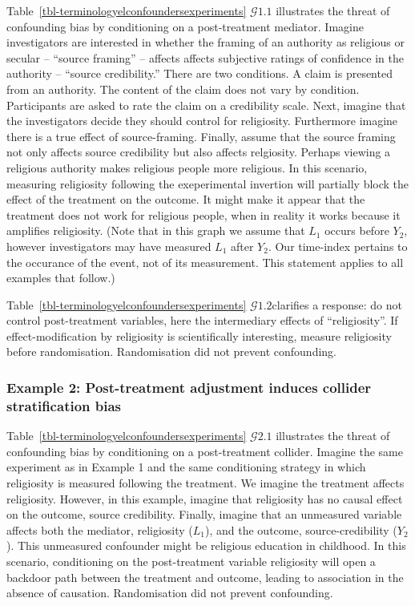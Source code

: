 \documentclass[
  single column]{article}
\begin{document}
Table~\ref{tbl-terminologyelconfoundersexperiments} \(\mathcal{G} 1.1\)
illustrates the threat of confounding bias by conditioning on a
post-treatment mediator. Imagine investigators are interested in whether
the framing of an authority as religious or secular -- ``source
framing'' -- affects affects subjective ratings of confidence in the
authority -- ``source credibility.'' There are two conditions. A claim
is presented from an authority. The content of the claim does not vary
by condition. Participants are asked to rate the claim on a credibility
scale. Next, imagine that the investigators decide they should control
for religiosity. Furthermore imagine there is a true effect of
source-framing. Finally, assume that the source framing not only affects
source credibility but also affects relgiosity. Perhaps viewing a
religious authority makes religious people more religious. In this
scenario, measuring religiosity following the exeperimental invertion
will partially block the effect of the treatment on the outcome. It
might make it appear that the treatment does not work for religious
people, when in reality it works because it amplifies religiosity. (Note
that in this graph we assume that \(L_1\) occurs before \(Y_2\), however
investigators may have measured \(L_1\) after \(Y_2\). Our time-index
pertains to the occurance of the event, not of its measurement. This
statement applies to all examples that follow.)

Table~\ref{tbl-terminologyelconfoundersexperiments}
\(\mathcal{G} 1.2\)clarifies a response: do not control post-treatment
variables, here the intermediary effects of ``religiosity''. If
effect-modification by religiosity is scientifically interesting,
measure religiosity before randomisation. Randomisation did not prevent
confounding.

\subsubsection{Example 2: Post-treatment adjustment induces collider
stratification
bias}\label{example-2-post-treatment-adjustment-induces-collider-stratification-bias}

Table~\ref{tbl-terminologyelconfoundersexperiments} \(\mathcal{G} 2.1\)
illustrates the threat of confounding bias by conditioning on a
post-treatment collider. Imagine the same experiment as in Example 1 and
the same conditioning strategy in which religiosity is measured
following the treatment. We imagine the treatment affects religiosity.
However, in this example, imagine that religiosity has no causal effect
on the outcome, source credibility. Finally, imagine that an unmeasured
variable affects both the mediator, religiosity (\(L_1\)), and the
outcome, source-credibility (\(Y_2\)). This unmeasured confounder might
be religious education in childhood. In this scenario, conditioning on
the post-treatment variable religiosity will open a backdoor path
between the treatment and outcome, leading to association in the absence
of causation. Randomisation did not prevent confounding.
\end{document}
